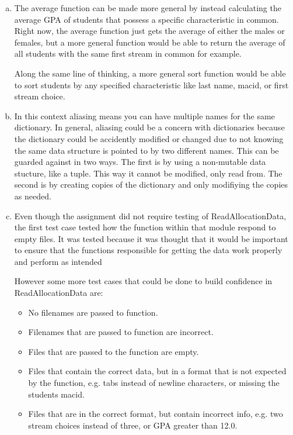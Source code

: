 \documentclass[12pt]{article}
\begin{document}
\begin{enumerate}[(a)]

\item The average function can be made more general by instead calculating the average
GPA of students that possess a specific characteristic in common. Right now, the average
function just gets the average of either the males or females, but a more general function
would be able to return the average of all students with the same first stream in common
for example.

Along the same line of thinking, a more general sort function would be able to sort students
by any specified characteristic like last name, macid, or first stream choice.

\item In this context aliasing means you can have multiple names for the same dictionary.
In general, aliasing could be a concern with dictionaries because the dictionary could
be accidently modified or changed due to not knowing the same data structure is pointed
to by two different names. This can be guarded against in two ways. The first is by using
a non-mutable data stucture, like a tuple. This way it cannot be modified, only read from. The
second is by creating copies of the dictionary and only modifiying the copies as needed.

\item Even though the assignment did not require testing of ReadAllocationData, the 
first test case tested how the function within that module respond to empty files. 
It was tested because it was thought that it would be important to ensure that the
functions responsible for getting the data work properly and perform as intended

However some more test cases that could be done to build confidence in ReadAllocationData
are:

\begin{itemize}
\item No filenames are passed to function.
\item Filenames that are passed to function are incorrect.
\item Files that are passed to the function are empty.
\item Files that contain the correct data, but in a format that is not expected
by the function, e.g. tabs instead of newline characters, or missing the students 
macid.
\item Files that are in the correct format, but contain incorrect info, e.g. two 
stream choices instead of three, or GPA greater than 12.0.
\end{itemize}


\end{enumerate}
\end{document}
